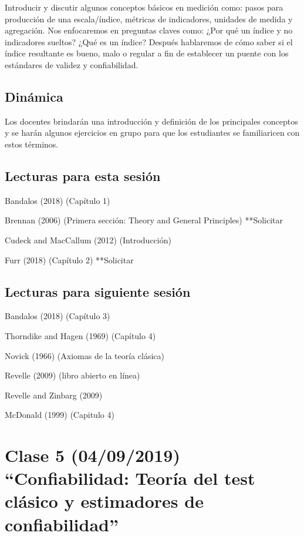 \documentclass[11pt,]{article}
\begin{document}
Introducir y discutir algunos conceptos básicos en medición como: pasos
para producción de una escala/índice, métricas de indicadores, unidades
de medida y agregación. Nos enfocaremos en preguntas claves como: ¿Por
qué un índice y no indicadores sueltos? ¿Qué es un índice? Después
hablaremos de cómo saber si el índice resultante es bueno, malo o
regular a fin de establecer un puente con los estándares de validez y
confiabilidad.

\hypertarget{dinamica-3}{%
\subsection{Dinámica}\label{dinamica-3}}

Los docentes brindarán una introducción y definición de los principales
conceptos y se harán algunos ejercicios en grupo para que los
estudiantes se familiaricen con estos términos.

\hypertarget{lecturas-para-esta-sesion-2}{%
\subsection{Lecturas para esta
sesión}\label{lecturas-para-esta-sesion-2}}

Bandalos (2018) (Capítulo 1)

Brennan (2006) (Primera sección: Theory and General Principles)
**Solicitar

Cudeck and MacCallum (2012) (Introducción)

Furr (2018) (Capítulo 2) **Solicitar

\hypertarget{lecturas-para-siguiente-sesion-2}{%
\subsection{Lecturas para siguiente
sesión}\label{lecturas-para-siguiente-sesion-2}}

Bandalos (2018) (Capítulo 3)

Thorndike and Hagen (1969) (Capítulo 4)

Novick (1966) (Axiomas de la teoría clásica)

Revelle (2009) (libro abierto en línea)

Revelle and Zinbarg (2009)

McDonald (1999) (Capitulo 4)

\hypertarget{clase-5-04092019-confiabilidad-teoria-del-test-clasico-y-estimadores-de-confiabilidad}{%
\section{Clase 5 (04/09/2019) ``Confiabilidad: Teoría del test clásico y
estimadores de
confiabilidad''}\label{clase-5-04092019-confiabilidad-teoria-del-test-clasico-y-estimadores-de-confiabilidad}}
\end{document}
